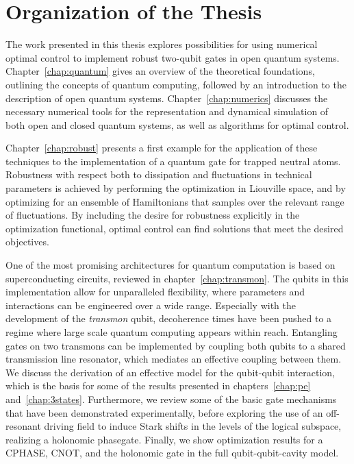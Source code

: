 \section{Organization of the Thesis}

The work presented in this thesis explores possibilities for using numerical
optimal control to implement robust two-qubit gates in open quantum systems.
Chapter~\ref{chap:quantum} gives an overview of the theoretical foundations,
outlining the concepts of quantum computing, followed by an introduction to the
description of open quantum systems.
Chapter~\ref{chap:numerics} discusses the necessary numerical tools for the
representation and dynamical simulation of both open and closed quantum systems,
as well as algorithms for optimal control.

Chapter~\ref{chap:robust} presents a first example for the application of these
techniques to the implementation of a quantum gate for trapped neutral atoms.
Robustness with respect both to dissipation and fluctuations in technical
parameters is achieved by performing the optimization in Liouville space, and
by optimizing for an ensemble of Hamiltonians that samples over the relevant
range of fluctuations. By including the desire for robustness explicitly in the
optimization functional, optimal control can find solutions that meet the
desired objectives.

One of the most promising architectures for quantum computation is based on
superconducting circuits, reviewed in chapter~\ref{chap:transmon}. The qubits in
this implementation allow for unparalleled flexibility, where parameters
and interactions can be engineered over a wide range. Especially with
the development of the \emph{transmon} qubit,
%
decoherence times have been pushed
to a regime where large scale quantum computing appears within reach. Entangling
gates on two transmons can be implemented by coupling both qubits to a shared
transmission line resonator, which mediates an effective coupling between them.
We discuss the derivation of an effective model for the qubit-qubit
interaction, which is the basis for some of the results presented in
chapters~\ref{chap:pe} and~\ref{chap:3states}. Furthermore, we review
some of the basic gate mechanisms that have been demonstrated experimentally,
before exploring the use of an off-resonant driving field to induce Stark shifts
in the levels of the logical subspace, realizing a holonomic phasegate. Finally,
we show optimization results for a CPHASE, CNOT, and the holonomic gate in the
full qubit-qubit-cavity model.

